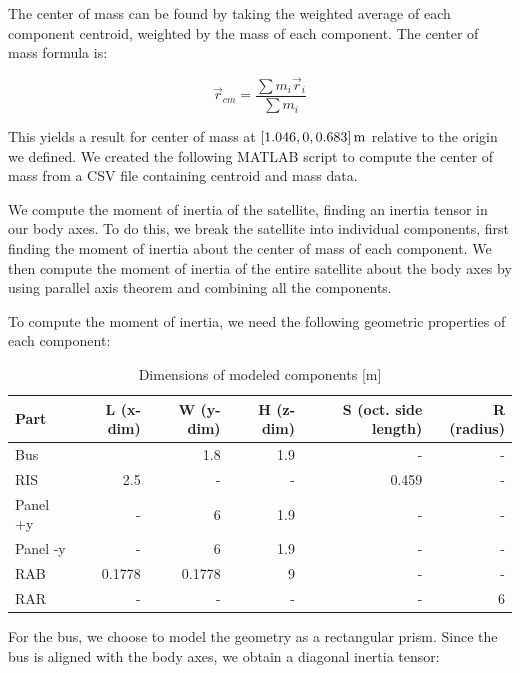 The center of mass can be found by taking the weighted average of each component centroid, weighted by the mass of each component. The center of mass formula is:

\begin{equation*}
    \Vec{r}_{cm} = \frac{\sum m_{i} \Vec{r}_{i}}{\sum m_{i}}
\end{equation*}

This yields a result for center of mass at $\qty[parse-numbers = false]{[1.046, 0, 0.683]}{\metre}$ relative to the origin we defined. We created the following MATLAB script to compute the center of mass from a CSV file containing centroid and mass data.



We compute the moment of inertia of the satellite, finding an inertia tensor in our body axes. To do this, we break the satellite into individual components, first finding the moment of inertia about the center of mass of each component. We then compute the moment of inertia of the entire satellite about the body axes by using parallel axis theorem and combining all the components.

To compute the moment of inertia, we need the following geometric properties of each component:

\begin{longtable}{l|r|r|r|r|r}
\caption{Dimensions of modeled components [m]}
\label{tab:dimensions}\\
\textbf{Part} & \textbf{L (x-dim)} & \textbf{W (y-dim)} & \textbf{H (z-dim)} & \textbf{S (oct. side length)} & \textbf{R (radius)} \\ \hline
\endfirsthead
%
\endhead
%
Bus &  & 1.8 & 1.9 & - & - \\
RIS & 2.5 & - & - & 0.459 & - \\
Panel +y & - & 6 & 1.9 & - & - \\
Panel -y & - & 6 & 1.9 & - & - \\
RAB & 0.1778 & 0.1778 & 9 & - & - \\
RAR & - & - & - & - & 6
\end{longtable}

For the bus, we choose to model the geometry as a rectangular prism. Since the bus is aligned with the body axes, we obtain a diagonal inertia tensor:

